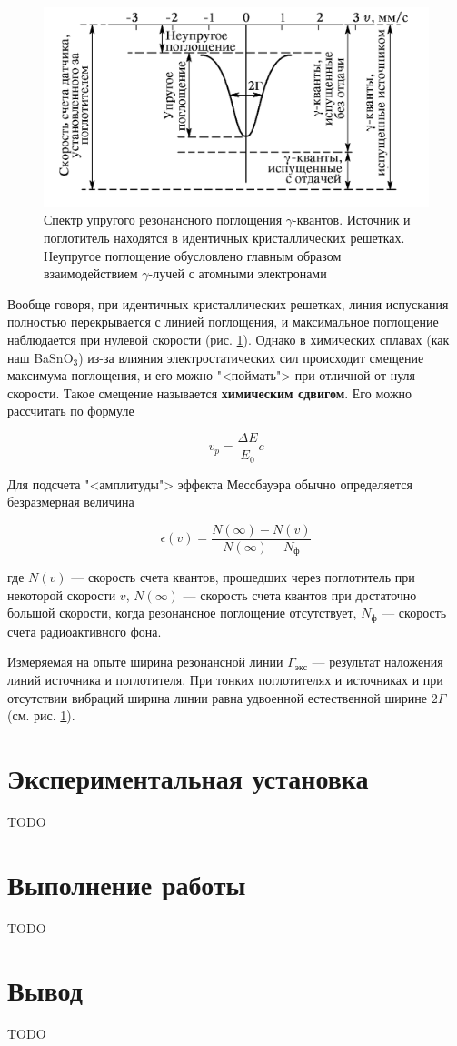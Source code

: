 \documentclass[12pt]{kiarticle}
\begin{document}
		\begin{figure}[h!]
		\centering
			\includegraphics[width=0.7\linewidth]{spektr}
		\caption{Спектр упругого резонансного поглощения $ \gamma $-квантов. Источник и поглотитель находятся в идентичных кристаллических решетках. Неупругое поглощение
			обусловлено главным образом взаимодействием $ \gamma $-лучей с атомными электронами}
		\label{ris 2}
	\end{figure}
	
	Вообще говоря, при идентичных кристаллических решетках, линия испускания полностью перекрывается с линией поглощения, и максимальное поглощение
	наблюдается при нулевой скорости (рис. \ref{ris 2}). Однако в химических сплавах (как наш BaSnO$_3$) из-за влияния электростатических сил происходит смещение максимума поглощения, и его можно "<поймать"> при отличной от нуля скорости. Такое смещение называется \textbf{химическим сдвигом}. Его можно рассчитать по формуле 
	
	\begin{equation}\label{}
	v_p = \dfrac{\Delta E}{E_0}c
	\end{equation}
	
	Для подсчета "<амплитуды"> эффекта Мессбауэра обычно определяется безразмерная величина
	
	\begin{equation}\label{}
	\epsilon(v) = \dfrac{N (\infty) - N(v)}{N (\infty) - N_ф}
	\end{equation}
	
	где $ N(v) $ --- скорость счета квантов, прошедших через поглотитель при
	некоторой скорости $ v $, $ N (\infty) $ --- скорость счета квантов при достаточно
	большой скорости, когда резонансное поглощение отсутствует, $ N_ф  $ --- скорость счета радиоактивного фона.
	
	Измеряемая на опыте ширина резонансной линии $  \Gamma_{экс} $ --- результат наложения линий источника и поглотителя. При тонких поглотителях и источниках и при отсутствии вибраций ширина линии равна удвоенной естественной ширине $ 2\Gamma $ (см. рис. \ref{ris 2}).
	
	\section{Экспериментальная установка}
	
	TODO
	
	\section{Выполнение работы}
	
	TODO
	
	\section{Вывод}
	
	TODO
	
\end{document}
